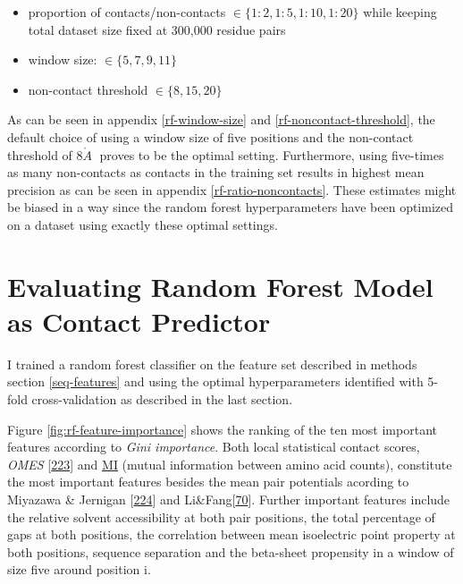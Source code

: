 \documentclass[11pt,a4paper,twoside]{book}
\providecommand{\tightlist}{%
  \setlength{\itemsep}{0pt}\setlength{\parskip}{0pt}}
\newcommand{\angstrom}{\mathring{A} \;}
\theoremstyle{definition}
\theoremstyle{definition}
\theoremstyle{remark}
\begin{document}
\begin{itemize}
\tightlist
\item
  proportion of contacts/non-contacts
  \(\in \{1\!:\!2, 1\!:\!5, 1\!:\!10, 1\!:\!20 \}\) while keeping total
  dataset size fixed at 300,000 residue pairs
\item
  window size: \(\in \{5, 7, 9, 11\}\)
\item
  non-contact threshold \(\in \{8, 15, 20\}\)
\end{itemize}

As can be seen in appendix \ref{rf-window-size} and
\ref{rf-noncontact-threshold}, the default choice of using a window size
of five positions and the non-contact threshold of \(8 \angstrom\)
proves to be the optimal setting. Furthermore, using five-times as many
non-contacts as contacts in the training set results in highest mean
precision as can be seen in appendix \ref{rf-ratio-noncontacts}. These
estimates might be biased in a way since the random forest
hyperparameters have been optimized on a dataset using exactly these
optimal settings.

\section{Evaluating Random Forest Model as Contact
Predictor}\label{evaluating-random-forest-model-as-contact-predictor}

I trained a random forest classifier on the feature set described in
methods section \ref{seq-features} and using the optimal hyperparameters
identified with 5-fold cross-validation as described in the last
section.

Figure \ref{fig:rf-feature-importance} shows the ranking of the ten most
important features according to \emph{Gini importance}. Both local
statistical contact scores, \emph{OMES}
{[}\protect\hyperlink{ref-Fodor2004a}{223}{]} and
\protect\hyperlink{abbrev}{MI} (mutual information between amino acid
counts), constitute the most important features besides the mean pair
potentials acording to Miyazawa \& Jernigan
{[}\protect\hyperlink{ref-Miyazawa1999a}{224}{]} and
Li\&Fang{[}\protect\hyperlink{ref-Li2011}{70}{]}. Further important
features include the relative solvent accessibility at both pair
positions, the total percentage of gaps at both positions, the
correlation between mean isoelectric point property at both positions,
sequence separation and the beta-sheet propensity in a window of size
five around position i.
\end{document}
